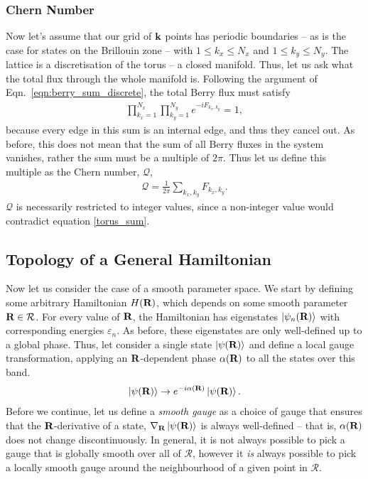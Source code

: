 \subsubsection{Chern Number} \label{sec:discrete_chern}
Now let's assume that our grid of $\textbf k$ points has periodic boundaries -- as is the case for states on the Brillouin zone -- with $1\leq k_x \leq N_x$ and $1 \leq k_y \leq N_y$. The lattice is a discretisation of the torus -- a closed manifold. Thus, let us ask what the total flux through the whole manifold is. Following the argument of Eqn.~\ref{eqn:berry_sum_discrete}, the total Berry flux must satisfy 
\begin{align}\label{torus_sum}
    \prod_{k_x=1}^{N_x}\prod_{k_y=1}^{N_y}e^{-i F_{k_x,k_y}} = 1,
\end{align}
because every edge in this sum is an internal edge, and thus they cancel out. As before, this does not mean that the sum of all Berry fluxes in the system vanishes, rather the sum must be a multiple of $2\pi$. Thus let us define this multiple as the Chern number, $\mathcal Q$,
\begin{align}\label{eqn:discrete_chern_number}
    \mathcal Q = \frac{1}{2\pi} \sum_{k_x,k_y}F_{k_x,k_y}.
\end{align}
$\mathcal Q$ is necessarily restricted to integer values, since a non-integer value would contradict equation \ref{torus_sum}.

\subsection{Topology of a General Hamiltonian}\label{sec:continuous_berry}

Now let us consider the case of a smooth parameter space. We start by defining some arbitrary Hamiltonian $H(\textbf R)$, which depends on some smooth parameter $\textbf R \in \mathcal R$. For every value of $\textbf R$, the Hamiltonian has eigenstates $\ket{\psi_n (\textbf R)}$ with corresponding energies $\varepsilon_n$. As before, these eigenstates are only well-defined up to a global phase. Thus, let consider a single state $\ket{\psi(\textbf R)}$ and define a local gauge transformation, applying an $\textbf R$-dependent phase $\alpha(\textbf R)$ to all the states over this band.
\begin{align}
	\ket{\psi(\textbf R)} \rightarrow e^{-i\alpha(\textbf R)}\ket{\psi(\textbf R)}.
\end{align}
Before we continue, let us define a \textit{smooth gauge} as a choice of gauge that ensures that the $\textbf R$-derivative of a state, $\nabla_{\textbf R}\ket{\psi(\textbf R)}$ is always well-defined -- that is, $\alpha(\textbf R)$ does not change discontinuously. In general, it is not always possible to pick a gauge that is globally smooth over all of $\mathcal{R}$, however it \textit{is} always possible to pick a locally smooth gauge around the neighbourhood of a given point in $\mathcal{R}$.


